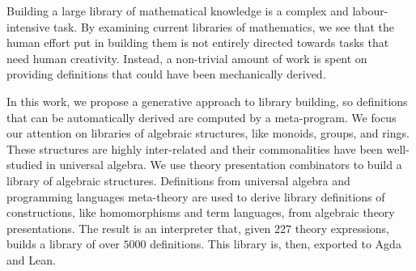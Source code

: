 
Building a large library of mathematical knowledge is a complex and labour-intensive task.
By examining current libraries of mathematics, we see that the human effort put in building them is not entirely directed towards tasks that need human creativity. 
Instead, a non-trivial amount of work is spent on providing definitions that could have been mechanically derived.


In this work, we propose a generative approach to library building, so definitions that can be automatically derived are computed by a meta-program. We focus our attention on libraries of algebraic structures, like monoids, groups, and rings. 
These structures are highly inter-related and their commonalities have been well-studied in universal algebra. We use theory presentation combinators to build a library of algebraic structures. Definitions from universal algebra and programming languages meta-theory are used to derive library definitions of constructions, like homomorphisms and term languages, from algebraic theory presentations. The result is an interpreter that, given $227$ theory expressions, builds a library of over $5000$ definitions. This library is, then, exported to Agda and Lean. 




